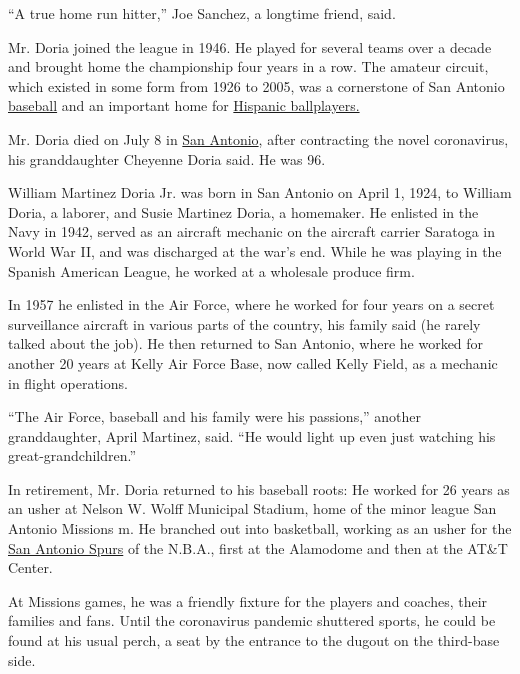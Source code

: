 ``A true home run hitter,'' Joe Sanchez, a longtime friend, said.

Mr. Doria joined the league in 1946. He played for several teams over a
decade and brought home the championship four years in a row. The
amateur circuit, which existed in some form from 1926 to 2005, was a
cornerstone of San Antonio
\href{https://www.nytimes.com/2020/07/20/sports/baseball/minor-leagues-coronavirus-fargo.html}{baseball}
and an important home for
\href{https://www.nytimes.com/2016/08/07/sports/baseball/eduardo-nunez-putting-accent-on-spanish-names.html}{Hispanic
ballplayers.}

Mr. Doria died on July 8 in
\href{https://www.nytimes.com/interactive/2020/us/texas-coronavirus-cases.html}{San
Antonio}, after contracting the novel coronavirus, his granddaughter
Cheyenne Doria said. He was 96.

William Martinez Doria Jr. was born in San Antonio on April 1, 1924, to
William Doria, a laborer, and Susie Martinez Doria, a homemaker. He
enlisted in the Navy in 1942, served as an aircraft mechanic on the
aircraft carrier Saratoga in World War II, and was discharged at the
war's end. While he was playing in the Spanish American League, he
worked at a wholesale produce firm.

In 1957 he enlisted in the Air Force, where he worked for four years on
a secret surveillance aircraft in various parts of the country, his
family said (he rarely talked about the job). He then returned to San
Antonio, where he worked for another 20 years at Kelly Air Force Base,
now called Kelly Field, as a mechanic in flight operations.

``The Air Force, baseball and his family were his passions,'' another
granddaughter, April Martinez, said. ``He would light up even just
watching his great-grandchildren.''

In retirement, Mr. Doria returned to his baseball roots: He worked for
26 years as an usher at Nelson W. Wolff Municipal Stadium, home of the
minor league San Antonio Missions m. He branched out into basketball,
working as an usher for the
\href{https://www.nytimes.com/2020/07/22/sports/basketball/nba-bubble-practice.html}{San
Antonio Spurs} of the N.B.A., first at the Alamodome and then at the
AT\&T Center.

At Missions games, he was a friendly fixture for the players and
coaches, their families and fans. Until the coronavirus pandemic
shuttered sports, he could be found at his usual perch, a seat by the
entrance to the dugout on the third-base side.

